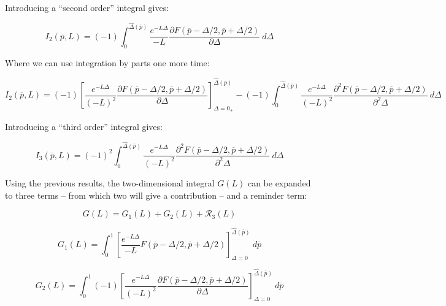 \documentclass{article}
\theoremstyle{definition}
\begin{document}
Introducing a ``second order'' integral gives:

\begin{equation}
    I_2(\overline{p},L)
    =
    (-1)
    \int_0^{\hat{\Delta}(\overline{p})}
    \frac{e^{- L \Delta}}{- L} 
    \frac{\partial
    F(\overline{p} - \Delta/2, \overline{p} + \Delta/2) 
    }{\partial \Delta}
    \ d \Delta
\end{equation}

Where we can use integration by parts one more time:

\begin{equation}
    I_2(\overline{p},L)
    =
    (-1)
    \left [
    \frac{e^{- L \Delta}}{(- L)^2} 
    \frac{\partial
    F(\overline{p} - \Delta/2, \overline{p} + \Delta/2) 
    }{\partial \Delta}
    \right ]_{\Delta=0_+}^{\hat{\Delta}(\overline{p})}
    -
    (-1)
    \int_0^{\hat{\Delta}(\overline{p})}
    \frac{e^{- L \Delta}}{(- L)^2} 
    \frac{\partial^2
    F(\overline{p} - \Delta/2, \overline{p} + \Delta/2) 
    }{\partial^2 \Delta}
    \ d \Delta
\end{equation}

Introducing a ``third order'' integral gives:

\begin{equation}
    I_3(\overline{p},L)
    =
    (-1)^2
    \int_0^{\hat{\Delta}(\overline{p})}
    \frac{e^{- L \Delta}}{(- L)^2} 
    \frac{\partial^2
    F(\overline{p} - \Delta/2, \overline{p} + \Delta/2) 
    }{\partial^2 \Delta}
    \ d \Delta
\end{equation}

Using the previous results, the two-dimensional integral $G(L)$ can be expanded to three terms -- from which two will give a contribution -- and a reminder term:

\begin{equation}
    G(L) = G_1(L) + G_2(L) + \mathcal{R}_3(L)
\end{equation}

\begin{equation}
    G_1(L)
    =
    \int_0^1  
    \left [
    \frac{e^{- L \Delta}}{- L} 
    F(\overline{p} - \Delta/2, \overline{p} + \Delta/2) 
    \right ]_{\Delta=0}^{\hat{\Delta}(\overline{p})}
    \ d\overline{p}
\end{equation}

\begin{equation}
    G_2(L)
    =
    \int_0^1  
    (-1)
    \left [
    \frac{e^{- L \Delta}}{(- L)^2} 
    \frac{\partial
    F(\overline{p} - \Delta/2, \overline{p} + \Delta/2) 
    }{\partial \Delta}
    \right ]_{\Delta=0}^{\hat{\Delta}(\overline{p})}
    \ d\overline{p}
\end{equation}
\end{document}
